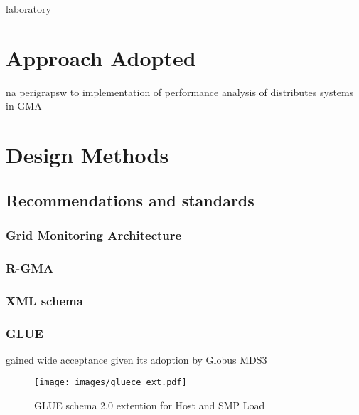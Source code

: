 laboratory

\section{Approach Adopted}

na perigrapsw to implementation of performance analysis of distributes systems
in GMA \cite{balatonuse}


\section{Design Methods}
\subsection{Recommendations and standards}
\subsubsection{Grid Monitoring Architecture}
\subsubsection{R-GMA}
\subsubsection{XML schema}
\subsubsection{GLUE}
gained wide acceptance given its adoption by Globus MDS3
\begin{figure}[htb]
\centering
 \texttt{[image: images/gluece\_ext.pdf]}
\caption{GLUE schema 2.0 extention for Host and SMP Load}
\label{figure:gluece_ext}
\end{figure}


